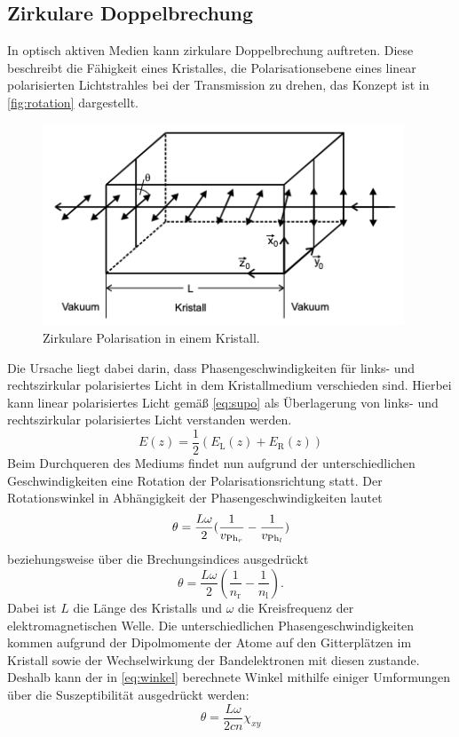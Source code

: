 \subsection{Zirkulare Doppelbrechung}
\label{sec:Faraday}

In optisch aktiven Medien kann zirkulare Doppelbrechung auftreten. Diese beschreibt die
Fähigkeit eines Kristalles, die Polarisationsebene eines linear polarisierten Lichtstrahles bei der Transmission zu drehen, das Konzept ist in 
\autoref{fig:rotation} dargestellt.

\begin{figure} [H]
    \centering
    \includegraphics[height=6cm]{content/rotation.png}
    \caption{Zirkulare Polarisation in einem Kristall. \cite{V46Anhang}}
    \label{fig:rotation}
\end{figure}

Die Ursache liegt dabei darin, dass Phasengeschwindigkeiten für links- und rechtszirkular polarisiertes Licht in dem Kristallmedium verschieden sind.
Hierbei kann linear polarisiertes Licht gemäß \autoref{eq:supo} als Überlagerung von links- und rechtszirkular polarisiertes Licht verstanden werden.
\begin{equation}
    E(z)=\frac{1}{2}(E_\text{L}(z)+E_\text{R}(z))
    \label{eq:supo}
\end{equation}
Beim Durchqueren des Mediums findet nun aufgrund der unterschiedlichen Geschwindigkeiten eine Rotation der Polarisationsrichtung statt.
Der Rotationswinkel in Abhängigkeit der Phasengeschwindigkeiten lautet
\begin{equation}
    \theta = \frac{L\omega}{2}(\frac{1}{v_{\text{Ph}_r}}-\frac{1}{v_{\text{Ph}_l}})
    \notag
\end{equation}
beziehungsweise über die Brechungsindices ausgedrückt
\begin{equation}
    \theta = \frac{L\omega}{2}(\frac{1}{n_{\text{r}}}-\frac{1}{n_{\text{l}}}).
    \label{eq:winkel}
\end{equation}
Dabei ist $L$ die Länge des Kristalls und $\omega$ die Kreisfrequenz der elektromagnetischen Welle.
Die unterschiedlichen Phasengeschwindigkeiten kommen aufgrund der Dipolmomente der Atome auf den Gitterplätzen im Kristall sowie
der Wechselwirkung der Bandelektronen mit diesen zustande. Deshalb kann der in \autoref{eq:winkel} berechnete Winkel mithilfe einiger
Umformungen über die Suszeptibilität ausgedrückt werden:
\begin{equation}
    \theta = \frac{L\omega}{2cn}\chi_{xy}
    \label{eq:thetatensor}
\end{equation}

